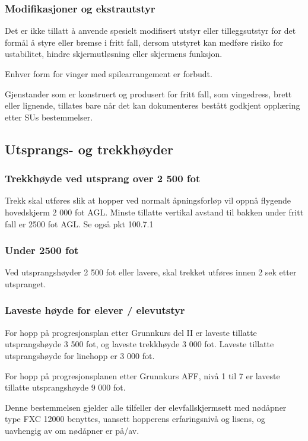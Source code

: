 \subsubsection{Modifikasjoner og ekstrautstyr}
Det er ikke tillatt å anvende spesielt modifisert utstyr eller tilleggsutstyr for det formål å styre eller bremse i fritt fall, dersom utstyret kan medføre risiko for ustabilitet, hindre skjermutløsning eller skjermens funksjon.

Enhver form for vinger med spilearrangement er forbudt.

Gjenstander som er konstruert og produsert for fritt fall, som vingedress, brett eller lignende, tillates bare når det kan dokumenteres bestått godkjent opplæring etter SUs bestemmelser.

\subsection{Utsprangs- og trekkhøyder}
\subsubsection{Trekkhøyde ved utsprang over 2 500 fot}
Trekk skal utføres slik at hopper ved normalt åpningsforløp vil oppnå flygende hovedskjerm 2 000 fot AGL. Minste tillatte vertikal avstand til bakken under fritt fall er 2500 fot AGL. Se også pkt 100.7.1

\subsubsection{Under 2500 fot}
Ved utsprangshøyder 2 500 fot eller lavere, skal trekket utføres innen 2 sek etter utspranget.

\subsubsection{Laveste høyde for elever / elevutstyr}
For hopp på progresjonsplan etter Grunnkurs del II er laveste tillatte utsprangshøyde 3 500 fot, og laveste trekkhøyde 3 000 fot. Laveste tillatte utsprangshøyde for linehopp er 3 000 fot.

For hopp på progresjonsplanen etter Grunnkurs AFF, nivå 1 til 7 er laveste tillatte utsprangshøyde 9 000 fot.

Denne bestemmelsen gjelder alle tilfeller der elevfallskjermsett med nødåpner type FXC 12000 benyttes, uansett hopperens erfaringsnivå og lisens, og uavhengig av om nødåpner er på/av.

